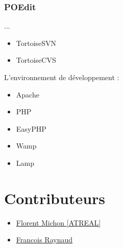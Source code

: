 \documentclass[letterpaper,10pt,french]{manual}
\begin{document}
\resetcurrentobjects
\hypertarget{--doc-outils/poedit}{}

\hypertarget{poedit}{}\subsection{POEdit}

...
\begin{itemize}
\item {} 
TortoiseSVN

\item {} 
TortoiseCVS

\end{itemize}

L'environnement de développement :
\begin{itemize}
\item {} 
Apache

\item {} 
PHP

\item {} 
EasyPHP

\item {} 
Wamp

\item {} 
Lamp

\end{itemize}


\chapter{Contributeurs}
\begin{itemize}
\item {} 
\href{mailto:fmichon@atreal.net}{Florent Michon {[}ATREAL{]}}

\item {} 
\href{mailto:contact@openmairie.org}{Francois Raynaud}

\end{itemize}


\renewcommand{\indexname}{Index du module}
\printmodindex
\renewcommand{\indexname}{Index}
\printindex
\end{document}
